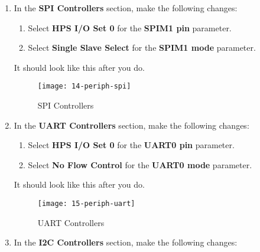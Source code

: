 \begin{flushleft}
\begin{enumerate}[
	label=\textbf{Step \arabic*.},
	leftmargin=*,
	widest={00},
	align=left]
\item In the \textbf{SPI Controllers} section, make the following changes:

\begin{enumerate}[
	label=\textbf{Step \arabic{enumi}\alph*.},
	leftmargin=*,
	align=left]

\item Select \textbf{HPS I/O Set 0} for the \textbf{SPIM1 pin} parameter.

\item Select \textbf{Single Slave Select} for the \textbf{SPIM1 mode} parameter.

\end{enumerate}

It should look like this after you do.

\begin{figure}[H]
\centering
\texttt{[image: 14-periph-spi]}
\caption{SPI Controllers}
\label{fig:14-periph-spi}
\end{figure}

\item In the \textbf{UART Controllers} section, make the following changes:

\begin{enumerate}[
	label=\textbf{Step \arabic{enumi}\alph*.},
	leftmargin=*,
	align=left]

\item Select \textbf{HPS I/O Set 0} for the \textbf{UART0 pin} parameter.

\item Select \textbf{No Flow Control} for the \textbf{UART0 mode} parameter.

\end{enumerate}

It should look like this after you do.

\begin{figure}[H]
\centering
\texttt{[image: 15-periph-uart]}
\caption{UART Controllers}
\label{fig:15-periph-uart}
\end{figure}

\newpage

\item In the \textbf{I2C Controllers} section, make the following changes:


\end{enumerate}
\end{flushleft}
